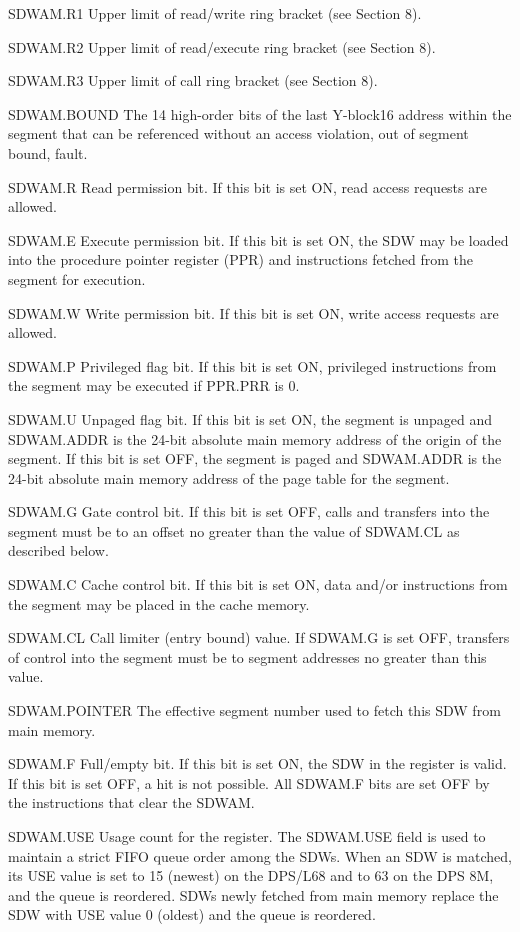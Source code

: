 SDWAM.R1 Upper limit of read/write ring bracket (see Section 8).

SDWAM.R2 Upper limit of read/execute ring bracket (see Section 8).

SDWAM.R3 Upper limit of call ring bracket (see Section 8).

SDWAM.BOUND The 14 high-order bits of the last Y-block16 address within the
segment that can be referenced without an access violation, out of segment
bound, fault.

SDWAM.R Read permission bit. If this bit is set ON, read access requests are
allowed.

SDWAM.E Execute permission bit. If this bit is set ON, the SDW may be loaded
into the procedure pointer register (PPR) and instructions fetched from the
segment for execution.

SDWAM.W Write permission bit. If this bit is set ON, write access requests are
allowed.

SDWAM.P Privileged flag bit. If this bit is set ON, privileged instructions
from the segment may be executed if PPR.PRR is 0.

SDWAM.U Unpaged flag bit. If this bit is set ON, the segment is unpaged and
SDWAM.ADDR is the 24-bit absolute main memory address of the origin of the
segment. If this bit is set OFF, the segment is paged and SDWAM.ADDR is the
24-bit absolute main memory address of the page table for the segment.

SDWAM.G Gate control bit. If this bit is set OFF, calls and transfers into the
segment must be to an offset no greater than the value of SDWAM.CL as described
below.

SDWAM.C Cache control bit. If this bit is set ON, data and/or instructions from
the segment may be placed in the cache memory.

SDWAM.CL Call limiter (entry bound) value. If SDWAM.G is set OFF, transfers of
control into the segment must be to segment addresses no greater than this
value.

SDWAM.POINTER The effective segment number used to fetch this SDW from main
memory.

SDWAM.F Full/empty bit. If this bit is set ON, the SDW in the register is
valid.  If this bit is set OFF, a hit is not possible. All SDWAM.F bits are set
OFF by the instructions that clear the SDWAM.

SDWAM.USE Usage count for the register. The SDWAM.USE field is used to maintain
a strict FIFO queue order among the SDWs. When an SDW is matched, its USE value
is set to 15 (newest) on the DPS/L68 and to 63 on the DPS 8M, and the queue is
reordered. SDWs newly fetched from main memory replace the SDW with USE value 0
(oldest) and the queue is reordered.

